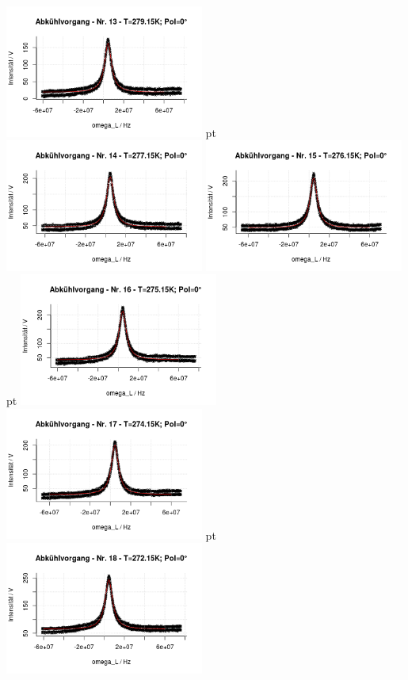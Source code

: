 \documentclass[12pt]{article}
\begin{document}
\begin{minipage}[h!]{\textwidth}
	\centering
		\includegraphics[width=0.49\textwidth]{figures/cold0-13.png} pt
		\includegraphics[width=0.49\textwidth]{figures/cold0-14.png}\vskip -10pt	\includegraphics[width=0.49\textwidth]{figures/cold0-15.png} pt
		\includegraphics[width=0.49\textwidth]{figures/cold0-16.png}\vskip -10pt
		\includegraphics[width=0.49\textwidth]{figures/cold0-17.png} pt	\includegraphics[width=0.49\textwidth]{figures/cold0-18.png}\vskip -10pt

\end{minipage}
\end{document}
